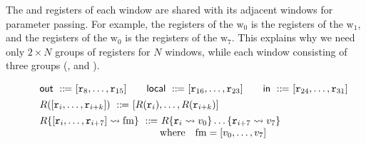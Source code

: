 The \inRN{} and \outRN{} registers of each window are shared
with its adjacent windows for parameter passing.
For example, the \inRN{} registers of the $\text{w}_0$
is the \outRN{} registers of the $\text{w}_1$,
and the \outRN{} registers of the $\text{w}_0$
is the \inRN{} registers of the $\text{w}_7$.
This explains
why we need only $2\times N$ groups of registers for
$N$ windows, while each window consisting of
three groups (\outRN{}, \localRN{} and \inRN{}).


\begin{figure}[!t]
    \[
     \begin{array}{l}
     \outRN \ \define \  [\reg{8}, \dots, \reg{15}]
     \qquad
     \localRN \ \define \  [\reg{16}, \dots, \reg{23}] %
      \qquad
     \inRN \ \define \  [\reg{24}, \dots, \reg{31}]
     \\
     \\[-8pt]
     \RFile([\reg{i}, \dots, \reg{i+k}]) \ \define\
     [\RFile(\reg{i}), \dots, \RFile(\reg{i+k})]
     \\
     \\[-8pt]
     \Rupd{\reg{i}, \dots, \reg{i+7}}{\fm} \ \define \
			R\{ \reg{i} \rightsquigarrow \val_0 \} 
				\dots \{ \reg{i+7} \rightsquigarrow \val_7 \} \\
            \hspace*{28ex}\text{where }\ \ \fm = [\val_0, \dots, \val_7]
     \\
     \\ %


\end{array}\]
\end{figure}
